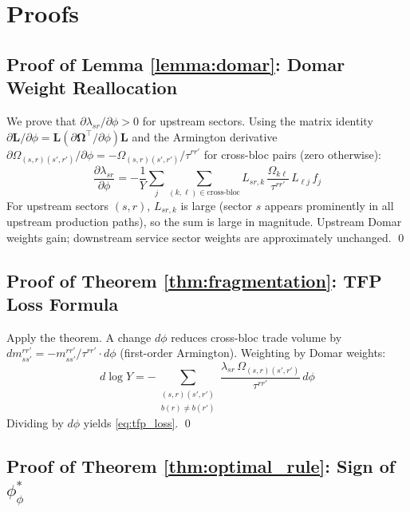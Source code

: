 \appendix

\section{Proofs}
\label{app:proofs}

\subsection{Proof of Lemma \ref{lemma:domar}: Domar Weight Reallocation}

We prove that $\partial\lambda_{sr}/\partial\phi > 0$ for upstream sectors.
Using the matrix identity $\partial\mathbf{L}/\partial\phi =
\mathbf{L}(\partial\boldsymbol\Omega^\top/\partial\phi)\mathbf{L}$ and the
Armington derivative $\partial\Omega_{(s,r)(s',r')}/\partial\phi
= -\Omega_{(s,r)(s',r')}/\tau^{rr'}$ for cross-bloc pairs (zero otherwise):
\begin{equation}
  \frac{\partial\lambda_{sr}}{\partial\phi} =
  -\frac{1}{Y}\sum_{j}\sum_{(k,\ell)\in\text{cross-bloc}}
  L_{sr,k}\,\frac{\Omega_{k\ell}}{\tau^{rr'}}\,L_{\ell j}\,f_j
\end{equation}
For upstream sectors $(s,r)$, $L_{sr,k}$ is large (sector $s$ appears
prominently in all upstream production paths), so the sum is large in
magnitude. Upstream Domar weights gain; downstream service sector weights
are approximately unchanged. \qed

\subsection{Proof of Theorem \ref{thm:fragmentation}: TFP Loss Formula}

Apply the \citet{hulten1978} theorem. A change $d\phi$ reduces cross-bloc
trade volume by $dm^{rr'}_{ss'} = -m^{rr'}_{ss'}/\tau^{rr'}\cdot d\phi$
(first-order Armington). Weighting by Domar weights:
\begin{equation}
  d\log Y = -\!\!\!\sum_{\substack{(s,r)(s',r')\\b(r)\neq b(r')}}
  \frac{\lambda_{sr}\,\Omega_{(s,r)(s',r')}}{\tau^{rr'}}\,d\phi
\end{equation}
Dividing by $d\phi$ yields \eqref{eq:tfp_loss}. \qed

\subsection{Proof of Theorem \ref{thm:optimal_rule}: Sign of $\phi_\phi^*$}

